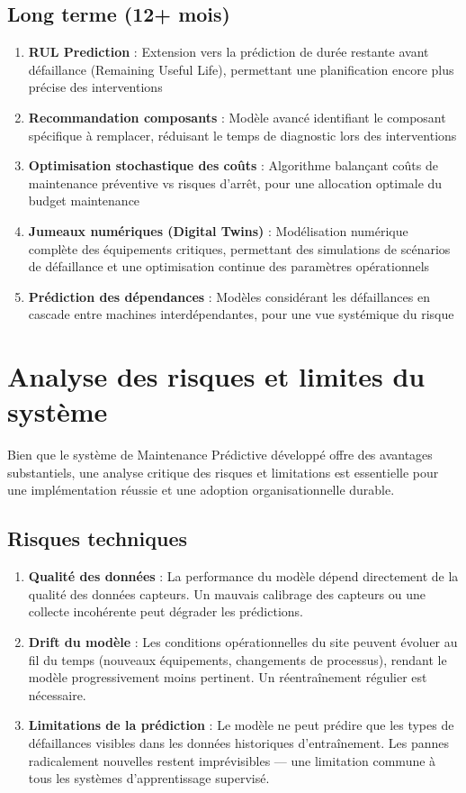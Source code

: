 \documentclass[a4paper,12pt]{report}
\begin{document}
\subsection{Long terme (12+ mois)}

\begin{enumerate}
    \item \textbf{RUL Prediction} : Extension vers la prédiction de durée restante avant défaillance (Remaining Useful Life), permettant une planification encore plus précise des interventions
    \item \textbf{Recommandation composants} : Modèle avancé identifiant le composant spécifique à remplacer, réduisant le temps de diagnostic lors des interventions
    \item \textbf{Optimisation stochastique des coûts} : Algorithme balançant coûts de maintenance préventive vs risques d'arrêt, pour une allocation optimale du budget maintenance
    \item \textbf{Jumeaux numériques (Digital Twins)} : Modélisation numérique complète des équipements critiques, permettant des simulations de scénarios de défaillance et une optimisation continue des paramètres opérationnels
    \item \textbf{Prédiction des dépendances} : Modèles considérant les défaillances en cascade entre machines interdépendantes, pour une vue systémique du risque
\end{enumerate}

\section{Analyse des risques et limites du système}

Bien que le système de Maintenance Prédictive développé offre des avantages substantiels, une analyse critique des risques et limitations est essentielle pour une implémentation réussie et une adoption organisationnelle durable.

\subsection{Risques techniques}

\begin{enumerate}
    \item \textbf{Qualité des données} : La performance du modèle dépend directement de la qualité des données capteurs. Un mauvais calibrage des capteurs ou une collecte incohérente peut dégrader les prédictions.
    
    \item \textbf{Drift du modèle} : Les conditions opérationnelles du site peuvent évoluer au fil du temps (nouveaux équipements, changements de processus), rendant le modèle progressivement moins pertinent. Un réentraînement régulier est nécessaire.
    
    \item \textbf{Limitations de la prédiction} : Le modèle ne peut prédire que les types de défaillances visibles dans les données historiques d'entraînement. Les pannes radicalement nouvelles restent imprévisibles — une limitation commune à tous les systèmes d'apprentissage supervisé.
\end{enumerate}
\end{document}
